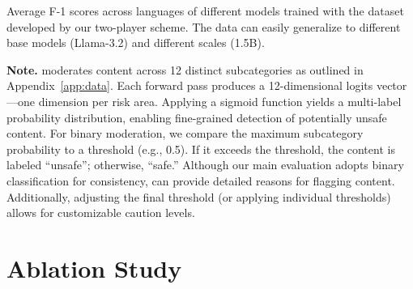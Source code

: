 \begin{table}[!ht]
    \centering
    \caption{Average F-1 scores across languages of different models trained with the dataset developed by our two-player scheme. The data can easily generalize to different base models (Llama-3.2) and different scales (1.5B).}
    \label{tab:main-2}
\end{table}

\textbf{Note.} \ours moderates content across 12 distinct subcategories as outlined in Appendix~\ref{app:data}. Each forward pass produces a 12-dimensional logits vector—one dimension per risk area. Applying a sigmoid function yields a multi-label probability distribution, enabling fine-grained detection of potentially unsafe content. For binary moderation, we compare the maximum subcategory probability to a threshold (e.g., 0.5). If it exceeds the threshold, the content is labeled “unsafe”; otherwise, “safe.” Although our main evaluation adopts binary classification for consistency, \ours can provide detailed reasons for flagging content. Additionally, adjusting the final threshold (or applying individual thresholds) allows for customizable caution levels.

\section{Ablation Study}
